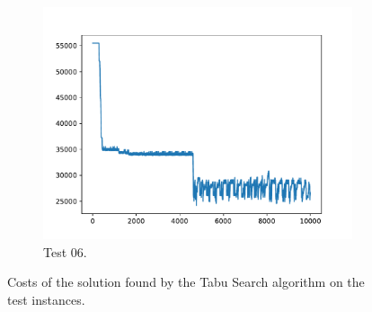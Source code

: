 \begin{figure}[h!]
\begin{subfigure}{0.45\textwidth}
        \includegraphics[width=\textwidth]{../logs/test06.pdf}
        \caption{Test $06$.}
    \end{subfigure}
    \caption{Costs of the solution found by the Tabu Search algorithm on the test instances.}
    \label{fig:plot}
\end{figure}